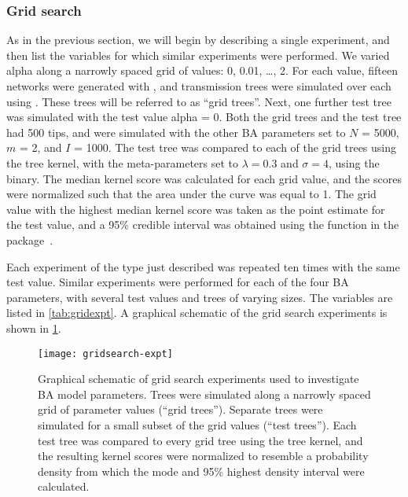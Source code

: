 \subsubsection*{Grid search}

As in the previous section, we will begin by describing a single experiment,
and then list the variables for which similar experiments were performed. We
varied \gls{alpha} along a narrowly spaced grid of values: 0, 0.01, \ldots, 2.
For each value, fifteen networks were generated with , and
transmission trees were simulated over each using . These
trees will be referred to as ``grid trees''. Next, one further test tree was
simulated with the test value \gls{alpha} = 0. Both the grid trees and the test
tree had 500 tips, and were simulated with the other \gls{BA} parameters set to
$N$ = 5000, $m$ = 2, and $I$ = 1000. The test tree was compared to each of the
grid trees using the tree kernel, with the meta-parameters set to $\lambda =
0.3$ and $\sigma = 4$, using the  binary. The median
kernel score was calculated for each grid value, and the scores were normalized
such that the area under the curve was equal to 1. The grid value with the
highest median kernel score was taken as the point estimate for the test value,
and a 95\% credible interval was obtained using the  function in
the  package~\autocite{snow2013teachingdemos}.

Each experiment of the type just described was repeated ten times with the same
test value. Similar experiments were performed for each of the four \gls{BA}
parameters, with several test values and trees of varying sizes. The variables
are listed in \cref{tab:gridexpt}. A graphical schematic of the grid search
experiments is shown in \cref{fig:gridexpt}. 

\begin{figure}[ht]
  \centering
  \texttt{[image: gridsearch-expt]}
  \caption[Schematic of grid search experiment.]{
    Graphical schematic of grid search experiments used to investigate \gls{BA}
    model parameters. Trees were simulated along a narrowly spaced grid of
    parameter values (``grid trees''). Separate trees were simulated for a
    small subset of the grid values (``test trees''). Each test tree was
    compared to every grid tree using the tree kernel, and the resulting kernel
    scores were normalized to resemble a probability density from which the
    mode and 95\% highest density interval were calculated.
  }
  \label{fig:gridexpt}
\end{figure}

